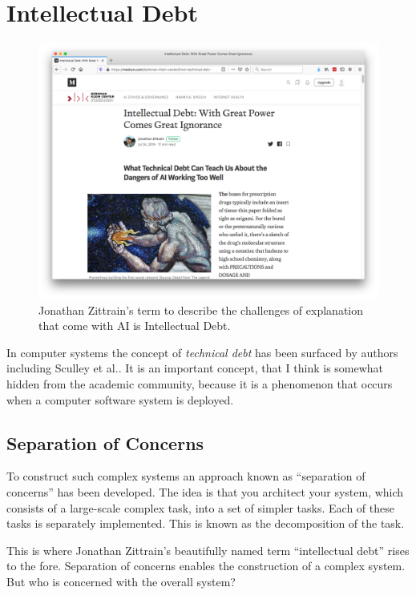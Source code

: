 \documentclass[a4paper]{caesar_book}
\begin{document}
\section{Intellectual Debt}

\begin{figure}[htbp]%
	\includegraphics[width=\textwidth,keepaspectratio]{pictures/2020-02-12-intellectual-debt.png}%
	\caption*{Jonathan Zittrain’s term to describe the challenges of explanation that come with AI is Intellectual Debt.}%
	\label{intellectual-debt}%
\end{figure}%

In computer systems the concept of \textit{technical debt} has been surfaced by authors including Sculley et al.. It is an important concept, that I think is somewhat hidden from the academic community, because it is a phenomenon that occurs when a computer software system is deployed.

\subsection{Separation of Concerns}

To construct such complex systems an approach known as ``separation of concerns'' has been developed. The idea is that you architect your system, which consists of a large-scale complex task, into a set of simpler tasks. Each of these tasks is separately implemented. This is known as the decomposition of the task.

This is where Jonathan Zittrain’s beautifully named term ``intellectual debt'' rises to the fore. Separation of concerns enables the construction of a complex system. But who is concerned with the overall system?
\end{document}
